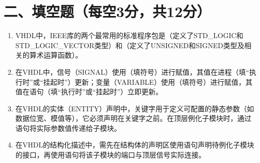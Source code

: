 \newpage

\section*{二、填空题（每空3分，共12分）}

\begin{enumerate}[label=\arabic*.]

\item VHDL中，IEEE库的两个最常用的标准程序包是\underline{\hspace{3.5cm}}（定义了STD\_LOGIC和STD\_LOGIC\_VECTOR类型）和\underline{\hspace{3.5cm}}（定义了UNSIGNED和SIGNED类型及相关的算术运算函数）。

\vspace{0.8cm}

\item 在VHDL中，信号（SIGNAL）使用\underline{\hspace{1.2cm}}（填符号）进行赋值，其值在进程\underline{\hspace{2.5cm}}（填“执行时”或“挂起时”）更新；变量（VARIABLE）使用\underline{\hspace{1.2cm}}（填符号）进行赋值，其值在语句\underline{\hspace{2.5cm}}（填“执行时”或“挂起时”）立即更新。

\vspace{0.8cm}

\item 在VHDL的实体（ENTITY）声明中，\underline{\hspace{2cm}}关键字用于定义可配置的静态参数（如数据位宽、模值等），它必须声明在\underline{\hspace{2cm}}关键字之前。在顶层例化子模块时，通过\underline{\hspace{2cm}}语句将实际参数值传递给子模块。

\vspace{0.8cm}

\item 在VHDL的结构化描述中，需先在结构体的声明区使用\underline{\hspace{2.5cm}}语句声明待例化子模块的接口，再使用\underline{\hspace{2.5cm}}语句将该子模块的端口与顶层信号实际连接。

\end{enumerate}

\newpage

